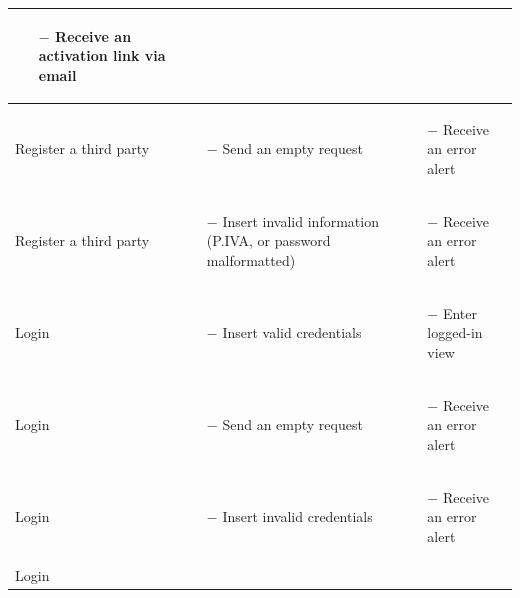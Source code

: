 \documentclass[titlepage]{article}
\begin{document}
\begin{longtable}{| p{3 cm} | p{4 cm} | p{4 cm} |}
\begin{itemize}[nolistsep]
			\item[$-$] Receive an activation link via email
		\end{itemize} \\ \hline
		Register a third party & \begin{itemize}[nolistsep]
			\item[$-$] Send an empty request
		\end{itemize}
		& \begin{itemize}[nolistsep]
			\item[$-$] Receive an error alert
		\end{itemize} \\ \hline
		Register a third party & \begin{itemize}[nolistsep]
			\item[$-$] Insert invalid information (P.IVA, or password malformatted)
		\end{itemize}
		& \begin{itemize}[nolistsep]
			\item[$-$] Receive an error alert
		\end{itemize} \\ \hline
		Login & \begin{itemize}[nolistsep]
			\item[$-$] Insert valid credentials
		\end{itemize}
		& \begin{itemize}[nolistsep]
			\item[$-$] Enter logged-in view
		\end{itemize} \\ \hline
		Login & \begin{itemize}[nolistsep]
			\item[$-$] Send an empty request
		\end{itemize}
		& \begin{itemize}[nolistsep]
			\item[$-$] Receive an error alert
		\end{itemize} \\ \hline
		Login & \begin{itemize}[nolistsep]
			\item[$-$] Insert invalid credentials
		\end{itemize}
		& \begin{itemize}[nolistsep]
			\item[$-$] Receive an error alert
		\end{itemize} \\ \hline
		Login & \begin{itemize}[nolistsep]

\end{itemize}
\end{longtable}
\end{document}
